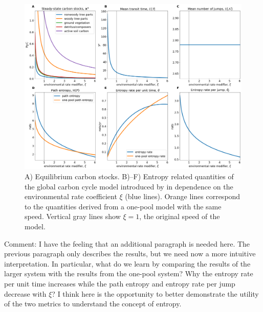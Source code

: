 \documentclass[smallextended]{svjour3}
\begin{document}
\begin{figure}[htbp]
    \centering
    \includegraphics[width=1.0\linewidth]{figs/Emanuel_entropies.png}
    \caption{
    A) Equilibrium carbon stocks. B)--F) Entropy related quantities of the global carbon cycle model introduced by \citet{Emanuel1981} in dependence on the environmental rate coefficient $\xi$ (blue lines).
    Orange lines correspond to the quantities derived from a one-pool model with the same speed.
    Vertical gray lines show $\xi=1$, the original speed of the model.}
    \label{fig:Emanuel_entropies}
\end{figure}

{\color{blue} Comment: I have the feeling that an additional paragraph is needed here. The previous paragraph only describes the results, but we need now a more intuitive interpretation. In particular, what do we learn by comparing the results of the larger system with the results from the one-pool system? Why the entropy rate per unit time increases while the path entropy and entropy rate per jump decrease with $\xi$? I think here is the opportunity to better demonstrate the utility of the two metrics to understand the concept of entropy.}
\end{document}
